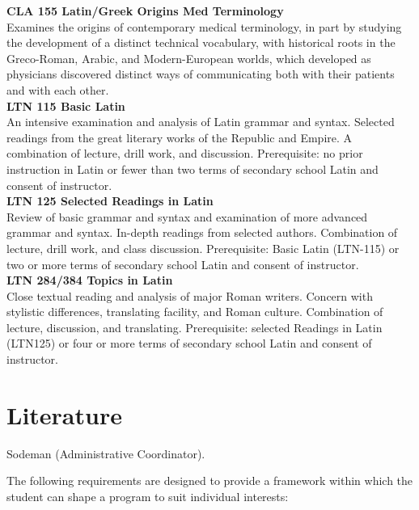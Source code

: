 \documentclass[
  letterpaper,
]{scrbook}
\begin{document}
\textbf{CLA 155 Latin/Greek Origins Med Terminology}\\
Examines the origins of contemporary medical terminology, in part by
studying the development of a distinct technical vocabulary, with
historical roots in the Greco-Roman, Arabic, and Modern-European worlds,
which developed as physicians discovered distinct ways of communicating
both with their patients and with each other.\\
\textbf{LTN 115 Basic Latin}\\
An intensive examination and analysis of Latin grammar and syntax.
Selected readings from the great literary works of the Republic and
Empire. A combination of lecture, drill work, and discussion.
Prerequisite: no prior instruction in Latin or fewer than two terms of
secondary school Latin and consent of instructor.\\
\textbf{LTN 125 Selected Readings in Latin}\\
Review of basic grammar and syntax and examination of more advanced
grammar and syntax. In-depth readings from selected authors. Combination
of lecture, drill work, and class discussion. Prerequisite: Basic Latin
(LTN-115) or two or more terms of secondary school Latin and consent of
instructor.\\
\textbf{LTN 284/384 Topics in Latin}\\
Close textual reading and analysis of major Roman writers. Concern with
stylistic differences, translating facility, and Roman culture.
Combination of lecture, discussion, and translating. Prerequisite:
selected Readings in Latin (LTN125) or four or more terms of secondary
school Latin and consent of instructor.

\section{Literature}\label{sec-literature}

Sodeman (Administrative Coordinator).

The following requirements are designed to provide a framework within
which the student can shape a program to suit individual interests:
\end{document}
